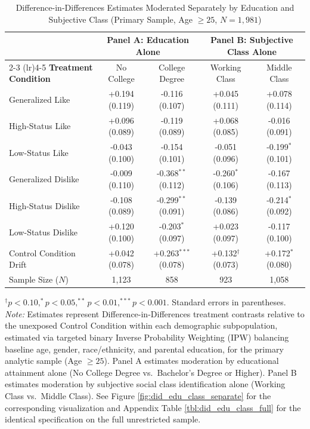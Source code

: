 \begin{table}[ht!]
\centering
\small
\caption{Difference-in-Differences Estimates Moderated Separately by Education and Subjective Class (Primary Sample, Age $\ge 25$, $N = 1{,}981$)}
\label{tbl:did_edu_class_primary}
\setlength{\tabcolsep}{2.0pt}
\begin{tabular*}{\linewidth}{@{\extracolsep{\fill}}lcccc@{}}
\toprule
& \multicolumn{2}{c}{\textbf{Panel A: Education Alone}} & \multicolumn{2}{c}{\textbf{Panel B: Subjective Class Alone}} \\
\cmidrule(lr){2-3} \cmidrule(lr){4-5}
\textbf{Treatment Condition} & No College & College Degree & Working Class & Middle Class \\
\midrule
Generalized Like & +0.194 (0.119) & -0.116 (0.107) & +0.045 (0.111) & +0.078 (0.114) \\
High-Status Like & +0.096 (0.089) & -0.119 (0.089) & +0.068 (0.085) & -0.016 (0.091) \\
Low-Status Like & -0.043 (0.100) & -0.154 (0.101) & -0.051 (0.096) & -0.199$^{*}$ (0.101) \\
Generalized Dislike & -0.009 (0.110) & -0.368$^{**}$ (0.112) & -0.260$^{*}$ (0.106) & -0.167 (0.113) \\
High-Status Dislike & -0.108 (0.089) & -0.299$^{**}$ (0.091) & -0.139 (0.086) & -0.214$^{*}$ (0.092) \\
Low-Status Dislike & +0.120 (0.100) & -0.203$^{*}$ (0.097) & +0.023 (0.097) & -0.117 (0.100) \\
\midrule
Control Condition Drift & +0.042 (0.078) & +0.263$^{***}$ (0.078) & +0.132$^{\dagger}$ (0.073) & +0.172$^{*}$ (0.080) \\
Sample Size ($N$) & 1,123 & 858 & 923 & 1,058 \\
\bottomrule
\end{tabular*}
\begin{minipage}{\linewidth}
\vspace{4pt}
\footnotesize
$^{\dagger}p < 0.10, ^{*}p < 0.05, ^{**}p < 0.01, ^{***}p < 0.001$. Standard errors in parentheses. \newline
\textit{Note:} Estimates represent Difference-in-Differences treatment contrasts relative to the unexposed Control Condition within each demographic subpopulation, estimated via targeted binary Inverse Probability Weighting (IPW) balancing baseline age, gender, race/ethnicity, and parental education, for the primary analytic sample (Age $\ge 25$). Panel A estimates moderation by educational attainment alone (No College Degree vs.\ Bachelor's Degree or Higher). Panel B estimates moderation by subjective social class identification alone (Working Class vs.\ Middle Class). See Figure \ref{fig:did_edu_class_separate} for the corresponding visualization and Appendix Table \ref{tbl:did_edu_class_full} for the identical specification on the full unrestricted sample.
\end{minipage}
\end{table}
